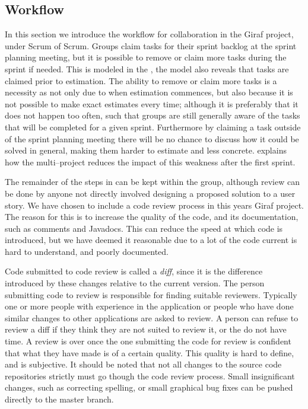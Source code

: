 \subsection{Workflow}
In this section we introduce the workflow for collaboration in the Giraf project, under Scrum of Scrum.
Groups claim tasks for their sprint backlog at the sprint planning meeting, but it is possible to remove or claim more tasks during the sprint if needed.
This is modeled in the , the model also reveals that tasks are claimed prior to estimation.
The ability to remove or claim more tasks is a necessity as not only due to when estimation commences, but also because it is not possible to make exact estimates every time; although it is preferably that it does not happen too often, such that groups are still generally aware of the tasks that will be completed for a given sprint.
Furthermore by claiming a task outside of the sprint planning meeting there will be no chance to discuss how it could be solved in general, making them harder to estimate and less concrete.
 explains how the multi--project reduces the impact of this weakness after the first sprint.

\bigskip
The remainder of the steps in  can be kept within the group, although review can be done by anyone not directly involved designing a proposed solution to a user story.
We have chosen to include a code review process in this years Giraf project.
The reason for this is to increase the quality of the code, and its documentation, such as comments and Javadocs.
This can reduce the speed at which code is introduced, but we have deemed it reasonable due to a lot of the code current is hard to understand, and poorly documented.

Code submitted to code review is called a \textit{diff}, since it is the difference introduced by these changes relative to the current version.
The person submitting code to review is responsible for finding suitable reviewers.
Typically one or more people with experience in the application or people who have done similar changes to other applications are asked to review.
A person can refuse to review a diff if they think they are not suited to review it, or the do not have time.
A review is over once the one submitting the code for review is confident that what they have made is of a certain quality.
This quality is hard to define, and is subjective.
It should be noted that not all changes to the source code repositories strictly must go though the code review process.
Small insignificant changes, such as correcting spelling, or small graphical bug fixes can be pushed directly to the master branch.

